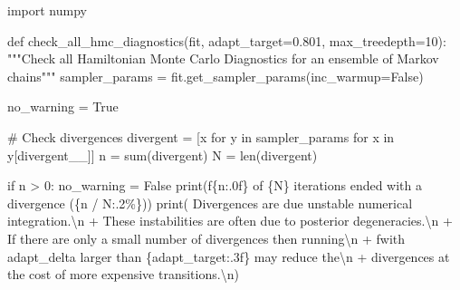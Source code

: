 \documentclass[
  letterpaper,
  DIV=11,
  numbers=noendperiod]{scrartcl}
\newenvironment{Shaded}{\begin{snugshade}}{\end{snugshade}}
\newcommand{\BuiltInTok}[1]{\textcolor[rgb]{0.00,0.23,0.31}{#1}}
\newcommand{\CharTok}[1]{\textcolor[rgb]{0.13,0.47,0.30}{#1}}
\newcommand{\CommentTok}[1]{\textcolor[rgb]{0.37,0.37,0.37}{#1}}
\newcommand{\ControlFlowTok}[1]{\textcolor[rgb]{0.00,0.23,0.31}{#1}}
\newcommand{\DecValTok}[1]{\textcolor[rgb]{0.68,0.00,0.00}{#1}}
\newcommand{\FloatTok}[1]{\textcolor[rgb]{0.68,0.00,0.00}{#1}}
\newcommand{\ImportTok}[1]{\textcolor[rgb]{0.00,0.46,0.62}{#1}}
\newcommand{\KeywordTok}[1]{\textcolor[rgb]{0.00,0.23,0.31}{#1}}
\newcommand{\NormalTok}[1]{\textcolor[rgb]{0.00,0.23,0.31}{#1}}
\newcommand{\OperatorTok}[1]{\textcolor[rgb]{0.37,0.37,0.37}{#1}}
\newcommand{\SpecialCharTok}[1]{\textcolor[rgb]{0.37,0.37,0.37}{#1}}
\newcommand{\SpecialStringTok}[1]{\textcolor[rgb]{0.13,0.47,0.30}{#1}}
\newcommand{\StringTok}[1]{\textcolor[rgb]{0.13,0.47,0.30}{#1}}
\newcommand{\VariableTok}[1]{\textcolor[rgb]{0.07,0.07,0.07}{#1}}
\begin{document}
\begin{Shaded}
\begin{Highlighting}[]
\ImportTok{import}\NormalTok{ numpy}

\KeywordTok{def}\NormalTok{ check\_all\_hmc\_diagnostics(fit,}
\NormalTok{                              adapt\_target}\OperatorTok{=}\FloatTok{0.801}\NormalTok{,}
\NormalTok{                              max\_treedepth}\OperatorTok{=}\DecValTok{10}\NormalTok{):}
  \CommentTok{"""Check all Hamiltonian Monte Carlo Diagnostics for an }
\CommentTok{     ensemble of Markov chains"""}
\NormalTok{  sampler\_params }\OperatorTok{=}\NormalTok{ fit.get\_sampler\_params(inc\_warmup}\OperatorTok{=}\VariableTok{False}\NormalTok{)}
  
\NormalTok{  no\_warning }\OperatorTok{=} \VariableTok{True}
  
  \CommentTok{\# Check divergences}
\NormalTok{  divergent }\OperatorTok{=}\NormalTok{ [x }\ControlFlowTok{for}\NormalTok{ y }\KeywordTok{in}\NormalTok{ sampler\_params }\ControlFlowTok{for}\NormalTok{ x }\KeywordTok{in}\NormalTok{ y[}\StringTok{\textquotesingle{}divergent\_\_\textquotesingle{}}\NormalTok{]]}
\NormalTok{  n }\OperatorTok{=} \BuiltInTok{sum}\NormalTok{(divergent)}
\NormalTok{  N }\OperatorTok{=} \BuiltInTok{len}\NormalTok{(divergent)}
  
  \ControlFlowTok{if}\NormalTok{ n }\OperatorTok{\textgreater{}} \DecValTok{0}\NormalTok{: }
\NormalTok{    no\_warning }\OperatorTok{=} \VariableTok{False}
    \BuiltInTok{print}\NormalTok{(}\SpecialStringTok{f\textquotesingle{}}\SpecialCharTok{\{}\NormalTok{n}\SpecialCharTok{:.0f\}}\SpecialStringTok{ of }\SpecialCharTok{\{}\NormalTok{N}\SpecialCharTok{\}}\SpecialStringTok{ iterations ended with a divergence (}\SpecialCharTok{\{}\NormalTok{n }\OperatorTok{/}\NormalTok{ N}\SpecialCharTok{:.2\%\}}\SpecialStringTok{)\textquotesingle{}}\NormalTok{)}
    \BuiltInTok{print}\NormalTok{(   }\StringTok{\textquotesingle{}  Divergences are due unstable numerical integration.}\CharTok{\textbackslash{}n}\StringTok{\textquotesingle{}}
          \OperatorTok{+}  \StringTok{\textquotesingle{}  These instabilities are often due to posterior degeneracies.}\CharTok{\textbackslash{}n}\StringTok{\textquotesingle{}}
          \OperatorTok{+}  \StringTok{\textquotesingle{}  If there are only a small number of divergences then running}\CharTok{\textbackslash{}n}\StringTok{\textquotesingle{}}
          \OperatorTok{+} \SpecialStringTok{f\textquotesingle{}with adapt\_delta larger than }\SpecialCharTok{\{}\NormalTok{adapt\_target}\SpecialCharTok{:.3f\}}\SpecialStringTok{ may reduce the}\CharTok{\textbackslash{}n}\SpecialStringTok{\textquotesingle{}}
          \OperatorTok{+} \StringTok{\textquotesingle{}divergences at the cost of more expensive transitions.}\CharTok{\textbackslash{}n}\StringTok{\textquotesingle{}}\NormalTok{)}
  

\end{Highlighting}
\end{Shaded}
\end{document}
